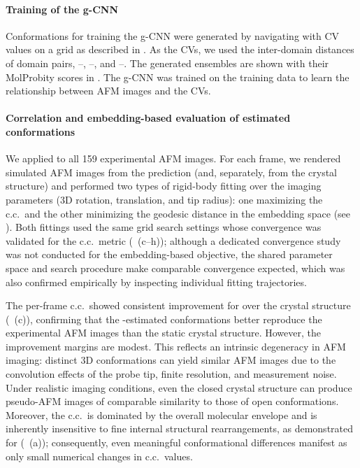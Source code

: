 \paragraph{Training of the g-CNN}
Conformations for training the g-CNN were generated by navigating \AFiii with CV values on a grid as described in .
As the CVs, we used the inter-domain distances of domain pairs, \acdi--\acdiv, \acdii--\acdiii, and \acdii--\acdiv.
The generated ensembles are shown with their MolProbity scores in .
The g-CNN was trained on the training data to learn the relationship between AFM images and the CVs.

\paragraph{Correlation and embedding-based evaluation of estimated conformations}
We applied \Model to all 159 experimental AFM images. For each frame, we rendered simulated AFM images from the \Model prediction (and, separately, from the crystal structure) and performed two types of rigid-body fitting over the imaging parameters (3D rotation, translation, and tip radius): one maximizing the c.c.\ and the other minimizing the geodesic distance in the embedding space (see ).
Both fittings used the same grid search settings whose convergence was validated for the c.c.\ metric (~(c--h)); although a dedicated convergence study was not conducted for the embedding-based objective, the shared parameter space and search procedure make comparable convergence expected, which was also confirmed empirically by inspecting individual fitting trajectories.

The per-frame c.c.\ showed consistent improvement for \Model over the crystal structure (~(c)), confirming that the \Model-estimated conformations better reproduce the experimental AFM images than the static crystal structure.
However, the improvement margins are modest.
This reflects an intrinsic degeneracy in AFM imaging: distinct 3D conformations can yield similar AFM images due to the convolution effects of the probe tip, finite resolution, and measurement noise.
Under realistic imaging conditions, even the closed crystal structure can produce pseudo-AFM images of comparable similarity to those of open conformations.
Moreover, the c.c.\ is dominated by the overall molecular envelope and is inherently insensitive to fine internal structural rearrangements, as demonstrated for \AK (~(a)); consequently, even meaningful conformational differences manifest as only small numerical changes in c.c.\ values.

